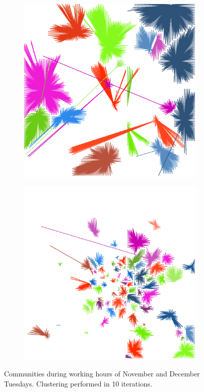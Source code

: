 \documentclass[12pt,a4paper]{article}
\begin{document}
\begin{figure}[H]
\begin{subfigure}[b]{0.3\textwidth}
\end{subfigure}
\begin{subfigure}[b]{0.3\textwidth}
\includegraphics[width=\textwidth]{weekDef/edges-2Tue-mid.png}
\end{subfigure}
\begin{subfigure}[b]{0.3\textwidth}
\includegraphics[width=\textwidth]{weekDef/edges-2Tue-small.png}
\end{subfigure}
\label{fig:tuesdayworking}
\caption{Communities during working hours of November and December Tuesdays. Clustering performed in 10 iterations.}
\end{figure}
\end{document}
